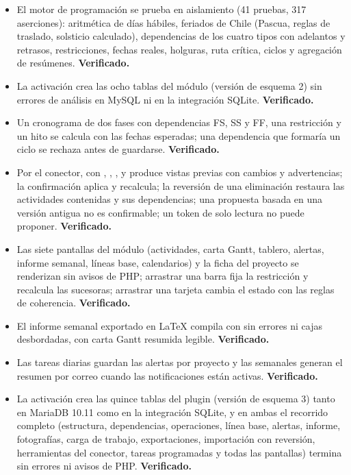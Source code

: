 \documentclass[11pt,a4paper]{article}
\begin{document}
\begin{itemize}
\item El motor de programación se prueba en aislamiento (41 pruebas, 317 aserciones): aritmética de días hábiles, feriados de Chile (Pascua, reglas de traslado, solsticio calculado), dependencias de los cuatro tipos con adelantos y retrasos, restricciones, fechas reales, holguras, ruta crítica, ciclos y agregación de resúmenes. \textbf{Verificado.}
\item La activación crea las ocho tablas del módulo (versión de esquema 2) sin errores de análisis en MySQL ni en la integración SQLite. \textbf{Verificado.}
\item Un cronograma de dos fases con dependencias FS, SS y FF, una restricción y un hito se calcula con las fechas esperadas; una dependencia que formaría un ciclo se rechaza antes de guardarse. \textbf{Verificado.}
\item Por el conector,  con , , ,  y  produce vistas previas con cambios y advertencias; la confirmación aplica y recalcula; la reversión de una eliminación restaura las actividades contenidas y sus dependencias; una propuesta basada en una versión antigua no es confirmable; un token de solo lectura no puede proponer. \textbf{Verificado.}
\item Las siete pantallas del módulo (actividades, carta Gantt, tablero, alertas, informe semanal, líneas base, calendarios) y la ficha del proyecto se renderizan sin avisos de PHP; arrastrar una barra fija la restricción y recalcula las sucesoras; arrastrar una tarjeta cambia el estado con las reglas de coherencia. \textbf{Verificado.}
\item El informe semanal exportado en LaTeX compila con  sin errores ni cajas desbordadas, con carta Gantt resumida legible. \textbf{Verificado.}
\item Las tareas diarias guardan las alertas por proyecto y las semanales generan el resumen por correo cuando las notificaciones están activas. \textbf{Verificado.}
\item La activación crea las quince tablas del plugin (versión de esquema 3) tanto en MariaDB 10.11 como en la integración SQLite, y en ambas el recorrido completo (estructura, dependencias, operaciones, línea base, alertas, informe, fotografías, carga de trabajo, exportaciones, importación con reversión, herramientas del conector, tareas programadas y todas las pantallas) termina sin errores ni avisos de PHP. \textbf{Verificado.}

\end{itemize}
\end{document}

